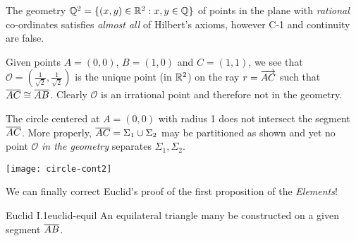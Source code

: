 \begin{example}{}{}
	The geometry $\mathbb{Q}^2=\{(x,y)\in\mathbb{R}^2:x,y\in\mathbb{Q}\}$ of points in the plane with \emph{rational} co-ordinates satisfies \emph{almost all} of Hilbert's axioms, however C-1 and continuity are false.\par
	\begin{minipage}[t]{0.7\linewidth}\vspace{-5pt}
		\begin{description}\itemsep0pt
			\item[\normalfont\emph{Axiom C-1}] Given points $A=(0,0)$, $B=(1,0)$ and $C=(1,1)$, we see that $\mathcal O=(\frac 1{\sqrt 2},\frac 1{\sqrt 2})$ is the unique point (in $\mathbb{R}^2$) on the ray $r=\overrightarrow{AC}$ such that $\overline{AC}\cong\overline{AB}$. Clearly $\mathcal O$ is an irrational point and therefore not in the geometry.
			\item[\normalfont\emph{Continuity}] The circle centered at $A=(0,0)$ with radius 1 does not intersect the segment $\overline{AC}$. More properly, $\overline{AC}=\Sigma_1\cup\Sigma_2$ may be partitioned as shown and yet no point $\mathcal O$ \emph{in the geometry} separates $\Sigma_1,\Sigma_2$.
		\end{description}
	\end{minipage}
	\hfill
	\begin{minipage}[t]{0.29\linewidth}\vspace{0pt}
		\flushright 
		\texttt{[image: circle-cont2]}
	\end{minipage}
\end{example}


\goodbreak


We can finally correct Euclid's proof of the first proposition of the \emph{Elements}!


\begin{thm}{Euclid I.1}{euclid-equil}
	An equilateral triangle many be constructed on a given segment $\overline{AB}$.
\end{thm}

